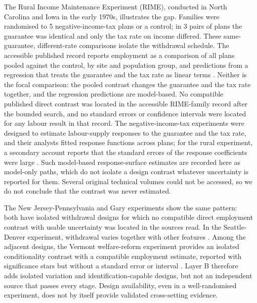 \documentclass[11pt]{article}
\begin{document}
The Rural Income Maintenance Experiment (RIME), conducted in North Carolina and Iowa in the early 1970s, illustrates the gap. Families were randomised to 5 negative-income-tax plans or a control; in 3 pairs of plans the guarantee was identical and only the tax rate on income differed. %
These same-guarantee, different-rate comparisons isolate the withdrawal schedule. The accessible published record reports employment as a comparison of all plans pooled against the control, by site and population group, and predictions from a regression that treats the guarantee and the tax rate as linear terms \citep{irp1976rime}. Neither is the focal comparison: the pooled contrast changes the guarantee and the tax rate together, and the regression predictions are model-based. No compatible published direct contrast was located in the accessible RIME-family record after the bounded search, and no standard errors or confidence intervals were located for any labour result in that record. The negative-income-tax experiments were designed to estimate labour-supply responses to the guarantee and the tax rate, and their analysts fitted response functions across plans; for the rural experiment, a secondary account reports that the standard errors of the response coefficients were large \citep{orrgubits2023}. Such model-based response-surface estimates are recorded here as model-only paths, which do not isolate a design contrast whatever uncertainty is reported for them. Several original technical volumes could not be accessed, so we do not conclude that the contrast was never estimated.

The New Jersey-Pennsylvania \citep{watts1974} and Gary \citep{kehrer1979} experiments show the same pattern: both have isolated withdrawal designs for which no compatible direct employment contrast with usable uncertainty was located in the sources read. In the Seattle-Denver experiment, withdrawal varies together with other features \citep{riddell2024}. Among the adjacent designs, the Vermont welfare-reform experiment provides an isolated conditionality contrast with a compatible employment estimate, reported with significance stars but without a standard error or interval \citep{scrivener2002}. Layer B therefore adds isolated variation and identification-capable designs, but not an independent source that passes every stage. Design availability, even in a well-randomised experiment, does not by itself provide validated cross-setting evidence.
\end{document}
